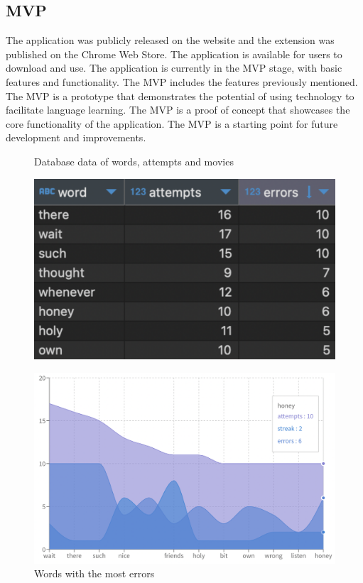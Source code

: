 \documentclass[12pt]{article}
\begin{document}
\subsection{MVP}
The application was publicly released on the website and the extension was published on the Chrome Web Store. The application is available for users to download and use. The application is currently in the MVP stage, with basic features and functionality. The MVP includes the features previously mentioned. \\
The MVP is a prototype that demonstrates the potential of using technology to facilitate language learning. The MVP is a proof of concept that showcases the core functionality of the application. The MVP is a starting point for future development and improvements. 
\begin{frame}{}
  \begin{figure}[!h]
      \begin{minipage}[b]{0.5\linewidth}
        \centering
        \caption{
        Database data of words, attempts and movies
        }
        \label{fig:database_data}
        \includegraphics[width=1\textwidth]{assets/32.png}
      \end{minipage}
      \hspace{0.1cm}
      \begin{minipage}[b]{0.5\linewidth}

        \centering
        \caption{
        Words with the most errors
        }
        \label{fig:database_errors}
        \includegraphics[width=1\textwidth]{assets/30.png}
       \end{minipage}
  \end{figure}
\end{frame}
\end{document}
